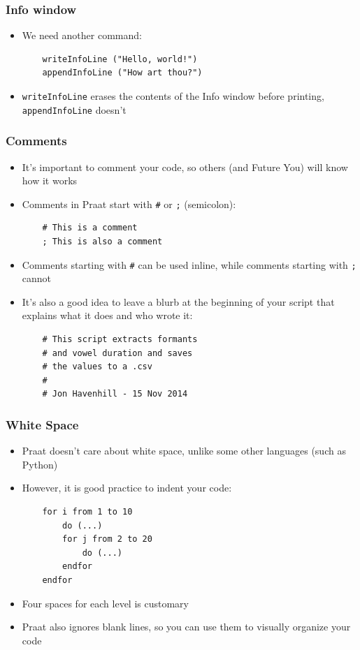 \documentclass[handout]{beamer}
\begin{document}
\begin{frame}[fragile]
\frametitle{Info window}
\begin{itemize}
    \item <1-> We need another command:
    \begin{verbatim}
    writeInfoLine ("Hello, world!")
    appendInfoLine ("How art thou?")\end{verbatim}

    \item <1-> \texttt{writeInfoLine} erases the contents of the Info window before printing, \texttt{appendInfoLine} doesn't
\end{itemize}
\end{frame}

\begin{frame}[fragile]
\frametitle{Comments}
\begin{itemize}
    \item <1-> It's important to comment your code, so others (and Future You) will know how it works
    \item <2-> Comments in Praat start with \texttt{\#} or \texttt{;} (semicolon):
    \begin{verbatim}
    # This is a comment
    ; This is also a comment\end{verbatim}
    \item <3-> Comments starting with \texttt{\#} can be used inline, while comments starting with \texttt{;} cannot
    \item <4-> It's also a good idea to leave a blurb at the beginning of your script that explains what it does and who wrote it:
    \begin{verbatim}
    # This script extracts formants
    # and vowel duration and saves
    # the values to a .csv
    #
    # Jon Havenhill - 15 Nov 2014
    \end{verbatim}
\end{itemize}
\end{frame}

\begin{frame}[fragile]
\frametitle{White Space}
\begin{itemize}
    \item <1-> Praat doesn't care about white space, unlike some other languages (such as Python)
    \item <1-> However, it is good practice to indent your code:
    \begin{verbatim}
    for i from 1 to 10
        do (...)
        for j from 2 to 20
            do (...)
        endfor
    endfor
    \end{verbatim}

    \item <2-> Four spaces for each level is customary
    \item <2-> Praat also ignores blank lines, so you can use them to visually organize your code  
\end{itemize}
\end{frame}
\end{document}
